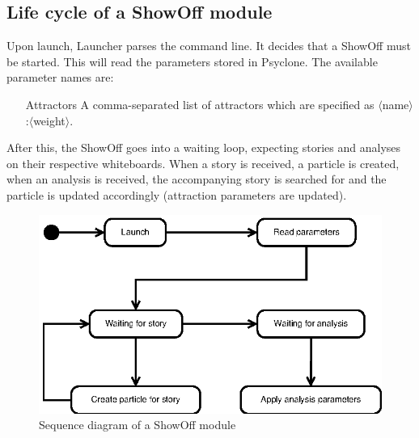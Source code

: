 \subsection{Life cycle of a ShowOff module}

Upon launch, Launcher parses the command line. It decides that a ShowOff must
be started. This will read the parameters stored in Psyclone. The available
parameter names are:

\begin{itemize}
 \item[Attractors] A comma-separated list of attractors which are specified as
                   $\langle$name$\rangle$:$\langle$weight$\rangle$.
\end{itemize}

After this, the ShowOff goes into a waiting loop, expecting stories and
analyses on their respective whiteboards. When a story is received, a particle
is created, when an analysis is received, the accompanying story is searched
for and the particle is updated accordingly (attraction parameters are
updated).

\begin{figure}[htp]
  \centering
  \includegraphics{image/sequence-diagram-showoff}
  \caption{Sequence diagram of a ShowOff module}
\end{figure}
